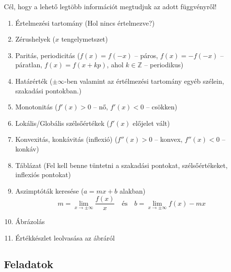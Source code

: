 \documentclass[a4paper, 12pt]{scrartcl}
\begin{document}
\begin{blueBox}

  Cél, hogy a lehető legtöbb információt megtudjuk az adott függvényről!
  \begin{enumerate}
    \item Értelmezési tartomány
          (Hol nincs értelmezve?)
    \item Zérushelyek
          ($x$ tengelymetszet)
    \item Paritás, periodicitás
          ($f(x) = f(-x)$ -- páros, $f(x) = -f(-x)$ -- páratlan, $f(x) = f(x +
            kp)$, ahol $k \in \mathbb Z$ -- periodikus)
    \item Határérték
          ($\pm \infty$-ben valamint az értélmezési tartomány egyéb szélein,
          szakadási pontokban.)
    \item Monotonitás
          ($f'(x) > 0$ -- nő, $f'(x) < 0$ -- csökken)
    \item Lokális/Globális szélsőértékek
          ($f'(x)$ előjelet vált)
    \item Konvexitás, konkávitás (inflexió)
          ($f''(x) > 0$ -- konvex, $f''(x) < 0$ -- konkáv)
    \item Táblázat
          (Fel kell benne tüntetni a szakadási pontokat, szélsőértékeket,
          inflexiós pontokat)
    \item Aszimptóták keresése ($a = mx + b$ alakban)
          \[
            m = \lim_{x \to \pm\infty} \frac{f(x)}{x}
            \quad \text{és} \quad
            b = \lim_{x \to \pm\infty} f(x) - mx
          \]
    \item Ábrázolás
    \item Értékkészlet leolvasása az ábráról
  \end{enumerate}
\end{blueBox}

\clearpage
\subsection{Feladatok}
\end{document}
